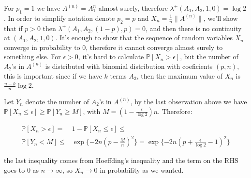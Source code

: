 \documentclass{article}
\begin{document}
For $p_1=1$ we have $A^{(n)}=A_1^n$ almost surely, therefore 
$\lambda^+(A_1,A_2,1,0)=\log 2$. In order to simplify notation denote $p_2=p$ and $X_n=\frac{1}{n}\|A^{(n)}\|$, we'll show that if $p>0$
then $\lambda^+(A_1,A_2,(1-p),p)=0$, and then there is no continuity at 
$(A_1,A_2,1,0)$. It's enough to show that the sequence of random variables $X_n$
converge in probability to 0, therefore it cannot converge almost surely to something
else. For $\epsilon>0$, it's hard to calculate $\mathbb{P}[X_n>\epsilon]$, 
but the number of $A_2$'s in $A^{(n)}$ is distributed with binomial distribution
with coeficients $(p,n)$, this is important since if we have $k$ terms
$A_2$, then the maximum value of $X_n$ is $\frac{n-k}{n}\log 2$.

Let $Y_n$ denote the number of $A_2$'s in $A^{(n)}$, by the last observation
above we have 
$\mathbb{P}[X_n\leq\epsilon]\geq \mathbb{P}[Y_n\geq M]$, with 
$M=(1-\frac{\epsilon}{\log 2})n$. Therefore:

\begin{align}
    \mathbb{P}[X_n>\epsilon]=&1-\mathbb{P}[X_n\leq \epsilon]\leq\\
    \mathbb{P}[Y_n<M]\leq & \exp\{-2n(p-\frac{M}{n})^2\}= \exp\{-2n(p+\frac{\epsilon}{\log 2}-1)^2\}
\end{align}

the last inequality comes from Hoeffding's inequality and the term
on the RHS goes to 0 as $n\to \infty$, so $X_n\to 0$ in probability as 
we wanted.
\end{document}
